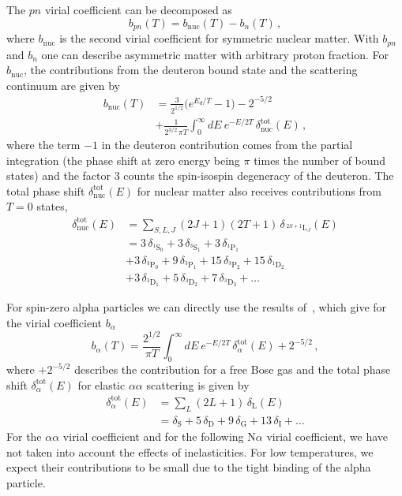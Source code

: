 \documentclass[aps,prc,twocolumn,showpacs,showkeys,amsmath,amssymb]{revtex4}
\begin{document}
The $pn$ virial coefficient can be decomposed as
\begin{equation}
b_{pn}(T)=b_{\text{nuc}}(T)-b_n(T) \,,
\label{bpn}
\end{equation}
where $b_{\text{nuc}}$ is the second virial coefficient for symmetric 
nuclear matter.  With $b_{pn}$ and $b_n$ one can describe asymmetric 
matter with arbitrary proton fraction.  For $b_{\text{nuc}}$,
the contributions from the deuteron bound state and the scattering
continuum are given by
\begin{align}
b_{\text{nuc}}(T) &= \frac{3}{2^{1/2}}\bigl(e^{E_d/T}-1\bigr) -2^{-5/2}
\nonumber \\[1mm]
&+ \frac{1}{2^{3/2}\,\pi T} \int_0^\infty dE \: e^{-E/2T} \, 
\delta^{\text{tot}}_{\text{nuc}}(E) \,,
\label{bnuc}
\end{align}
where the term $-1$ in the deuteron contribution comes from the 
partial integration (the phase shift at zero energy being $\pi$ 
times the number of bound states) and the factor $3$ counts the 
spin-isospin degeneracy of the deuteron. The total phase shift 
$\delta^{\text{tot}}_{\text{nuc}}(E)$ for nuclear matter 
also receives contributions from $T=0$ states,
\begin{align}
\delta^{\text{tot}}_{\text{nuc}}(E) &= \sum_{S,L,J} (2J+1)(2T+1) \, 
\delta_{\,^{2S+1}\text{L}_J}(E)
\nonumber \\[1mm]
&=3\,\delta_{^1\text{S}_0}+3\,\delta_{^3\text{S}_1}
+3\,\delta_{^1\text{P}_1} \nonumber \\[1mm]
&+3\,\delta_{^3\text{P}_0}
+9\,\delta_{^3\text{P}_1}+15\,\delta_{^3\text{P}_2}
+15\,\delta_{^1\text{D}_2} \nonumber \\[1mm]
&+3\,\delta_{^3\text{D}_1}+5\,\delta_{^3\text{D}_2}
+7\,\delta_{^3\text{D}_3}+ \ldots
\label{deltanuctot}
\end{align}

For spin-zero alpha particles we can directly use the results 
of~\cite{b2,huang}, which give for the virial coefficient $b_\alpha$
\begin{equation}
b_\alpha(T)=\frac{2^{1/2}}{\pi T} \int_0^\infty dE \: e^{-E/2T} \,
\delta^{\text{tot}}_\alpha(E) + 2^{-5/2} \,,
\label{ba}
\end{equation}
where $+2^{-5/2}$ describes the contribution for a free Bose gas 
and the total phase shift $\delta^{\text{tot}}_\alpha(E)$ for elastic
$\alpha\alpha$ scattering is given by
\begin{align}
\delta^{\text{tot}}_\alpha(E) &= \sum_{L} (2L+1) \,
\delta_{\text{L}}(E)
\nonumber \\[1mm]
&=\delta_{\text{S}}+5\,\delta_{\text{D}}+9\,\delta_{\text{G}}
+13\,\delta_{\text{I}} + \ldots
\label{deltaaatot}
\end{align}
For the $\alpha\alpha$ virial coefficient and for the following
N$\alpha$ virial coefficient, we have not taken into account the effects of
inelasticities. For low temperatures, we expect their contributions 
to be small due to the tight binding of the alpha particle.
\end{document}
